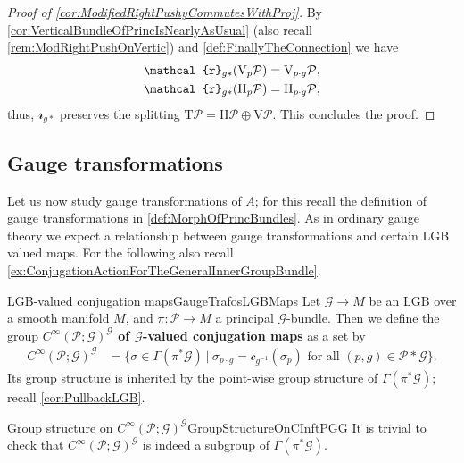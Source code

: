 \documentclass[reqno,a4paper,oneside]{amsart}
\theoremstyle{plain}
\theoremstyle{remark}
\theoremstyle{definition}
\begin{document}
\begin{proof}[Proof of \ref{cor:ModifiedRightPushyCommutesWithProj}]
\leavevmode\newline
By \ref{cor:VerticalBundleOfPrincIsNearlyAsUsual} (also recall \ref{rem:ModRightPushOnVertic}) and \ref{def:FinallyTheConnection} we have
\begin{align*}
\mathcal{r}_{g*}\mleft(\mathrm{V}_p\mathcal{P}\mright)
&=
\mathrm{V}_{p\cdot g}\mathcal{P},\\
\mathcal{r}_{g*}\mleft( \mathrm{H}_p\mathcal{P} \mright)
&=
\mathrm{H}_{p\cdot g}\mathcal{P},
\end{align*}
thus, $\mathcal{r}_{g*}$ preserves the splitting $\mathrm{T}\mathcal{P} = \mathrm{H}\mathcal{P} \oplus \mathrm{V}\mathcal{P}$. This concludes the proof.
\end{proof}

\subsection{Gauge transformations}\label{GaugeTrafoForA}

Let us now study gauge transformations of $A$; for this recall the definition of gauge transformations in \ref{def:MorphOfPrincBundles}. As in ordinary gauge theory we expect a relationship between gauge transformations and certain LGB valued maps. For the following also recall \ref{ex:ConjugationActionForTheGeneralInnerGroupBundle}.

\begin{definitions}{LGB-valued conjugation maps}{GaugeTrafosLGBMaps}
Let $\mathcal{G} \to M$ be an LGB over a smooth manifold $M$, and $\pi\colon\mathcal{P} \to M$ a principal $\mathcal{G}$-bundle. Then we define the group \textbf{$C^\infty(\mathcal{P}; \mathcal{G})^{\mathcal{G}}$ of $\mathcal{G}$-valued conjugation maps} as a set by
\begin{align*}
C^\infty(\mathcal{P}; \mathcal{G})^{\mathcal{G}}
&=
\bigl\{
	\sigma \in \Gamma(\pi^*\mathcal{G})
	~\big|~
	\sigma_{p \cdot g}
	=
	\mathcal{c}_{g^{-1}}( \sigma_p )
	\text{ for all } (p, g) \in \mathcal{P}*\mathcal{G}
\bigr\}.
\end{align*}
Its group structure is inherited by the point-wise group structure of $\Gamma(\pi^*\mathcal{G})$; recall \ref{cor:PullbackLGB}.
\end{definitions}

\begin{remarks}{Group structure on $C^\infty(\mathcal{P}; \mathcal{G})^{\mathcal{G}}$}{GroupStructureOnCInftPGG}
It is trivial to check that $C^\infty(\mathcal{P}; \mathcal{G})^{\mathcal{G}}$ is indeed a subgroup of $\Gamma(\pi^*\mathcal{G})$.
\end{remarks}
\end{document}
